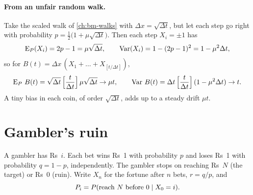 \begin{pic}
\end{pic}

\paragraph{From an unfair random walk.} Take the scaled walk of \cref{ch:bm-walks} with $\Delta x=\sqrt{\Delta t}$, but let each step go right with probability $p=\frac12\big(1+\mu\sqrt{\Delta t}\big)$. Then each step $X_i=\pm1$ has
\[
  \operatorname{E}_P(X_i)=2p-1=\mu\sqrt{\Delta t},\qquad \operatorname{Var}(X_i)=1-(2p-1)^2=1-\mu^2\Delta t,
\]
so for $B(t)=\Delta x\,(X_1+\dots+X_{[t/\Delta t]})$,
\[
  \operatorname{E}_P\,B(t)=\sqrt{\Delta t}\,\Big[\frac{t}{\Delta t}\Big]\,\mu\sqrt{\Delta t}\to\mu t,\qquad
  \operatorname{Var}\,B(t)=\Delta t\,\Big[\frac{t}{\Delta t}\Big]\,(1-\mu^2\Delta t)\to t .
\]
A tiny bias in each coin, of order $\sqrt{\Delta t}$, adds up to a steady drift $\mu t$.

\section{Gambler's ruin}

\begin{setup}
A gambler has Rs~$i$. Each bet wins Rs~1 with probability $p$ and loses Rs~1 with probability $q=1-p$, independently. The gambler stops on reaching Rs~$N$ (the target) or Rs~$0$ (ruin). Write $X_n$ for the fortune after $n$ bets, $r=q/p$, and
\[
  P_i=P(\text{reach }N\text{ before }0\mid X_0=i).
\]
\end{setup}

